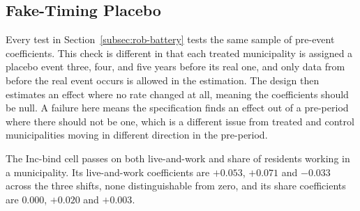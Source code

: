 \documentclass[12pt]{article}
\begin{document}


%
%
%


\subsection{Fake-Timing Placebo}
\label{subsec:rob-faketiming}

Every test in Section~\ref{subsec:rob-battery} tests the same sample of pre-event
coefficients. This check is different in that each treated
municipality is assigned a placebo event three, four, and five years before
its real one, and only data from before the real event occurs is allowed in the
estimation. The design then estimates an effect where no rate
changed at all, meaning the coefficients
should be null. A failure here means the specification finds an
effect out of a pre-period where there should not be one, which is a different issue from treated
and control municipalities moving in different direction in the pre-period.

The Inc-bind cell passes on both live-and-work and share of residents working in a municipality. Its
live-and-work coefficients are $+0.053$, $+0.071$ and $-0.033$ across the
three shifts, none distinguishable from zero, and its share coefficients
are $0.000$, $+0.020$ and $+0.003$.
\end{document}
